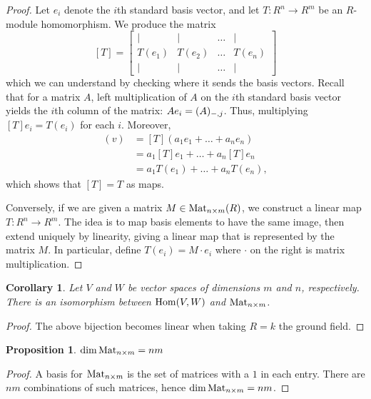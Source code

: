 \documentclass[12pt]{article}
\theoremstyle{definition}
\theoremstyle{plain}
\newtheorem{proposition}[theorem] {Proposition}
\newtheorem{corollary}[theorem]{Corollary}
\numberwithin{equation}{section}
\theoremstyle{definition}
\begin{document}
\begin{proof}
Let $ e_i $ denote the $ i $th standard basis vector, and let $ T : R^n \to R^m $ be an $ R $-module homomorphism. We produce the matrix
\[ [T] = \begin{bmatrix}
	\mid & \mid & \ldots & \mid\\
	T(e_1) & T(e_2) & \ldots & T(e_n)\\
	\mid & \mid & \ldots & \mid
\end{bmatrix}\]
which we can understand by checking where it sends the basis vectors. Recall that for a matrix $ A $, left multiplication of $ A $ on the $ i$th standard basis vector yields the $ i $th column of the matrix: $ A e_i = (A)_{-, \space j} $. Thus, multiplying $ [T] e_i = T(e_i) $ for each $ i $. Moreover, 
\begin{align*}
	[T](v) &= [T](a_1 e_1 + \ldots + a_n e_n)\\
	&= a_1 [T] e_1 + \ldots +a_n [T] e_n\\
	&= a_1 T(e_1) + \ldots + a_n T(e_n),
\end{align*}
which shows that $ [T] = T$ as maps.

Conversely, if we are given a matrix $ M \in \operatorname{Mat}_{n \times m}(R)$, we construct a linear map $ T : R^n \to R^m $. The idea is to map basis elements to have the same image, then extend uniquely by linearity, giving a linear map that is represented by the matrix $ M $. In particular, define $ T(e_i) = M \cdot e_i $ where $ \cdot $ on the right is matrix multiplication. 
\end{proof}

\begin{corollary}
Let $ V $ and $ W $ be vector spaces of dimensions $ m $ and $ n $, respectively. There is an isomorphism between $ \operatorname{Hom}(V, W) $ and $ \operatorname{Mat}_{n \times m} $.
\end{corollary}

\begin{proof}
The above bijection becomes linear when taking $ R = k $ the ground field.
\end{proof}

\begin{proposition}
$ \dim \operatorname{Mat}_{n \times m} = nm $
\end{proposition}

\begin{proof}
A basis for $ \operatorname{Mat}_{n \times m} $ is the set of matrices with a $ 1 $ in each entry. There are $ nm $ combinations of such matrices, hence $ \dim \operatorname{Mat}_{n \times m} = nm $.
\end{proof}
\end{document}
